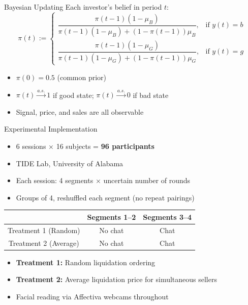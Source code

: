 \documentclass{beamer}
\begin{document}
\begin{frame}{Bayesian Updating}
Each investor's belief in period $t$:
\begin{equation*}
    \pi(t) :=
    \begin{cases}
        \dfrac{\pi(t\!-\!1)(1\!-\!\mu_B)}{\pi(t\!-\!1)(1\!-\!\mu_B) + (1\!-\!\pi(t\!-\!1))\mu_B}, & \text{if } y(t) = b \\[12pt]
        \dfrac{\pi(t\!-\!1)(1\!-\!\mu_G)}{\pi(t\!-\!1)(1\!-\!\mu_G) + (1\!-\!\pi(t\!-\!1))\mu_G}, & \text{if } y(t) = g
    \end{cases}
\end{equation*}

\begin{itemize}
    \item $\pi(0) = 0.5$ (common prior)
    \item $\pi(t) \overset{a.s.}{\to} 1$ if good state; $\pi(t) \overset{a.s.}{\to} 0$ if bad state
    \item Signal, price, and sales are all observable
\end{itemize}
\end{frame}


\begin{frame}{Experimental Implementation}
\begin{itemize}
    \item 6 sessions $\times$ 16 subjects = \textbf{96 participants}
    \item TIDE Lab, University of Alabama
    \item Each session: 4 segments $\times$ uncertain number of rounds
    \item Groups of 4, reshuffled each segment (no repeat pairings)
\end{itemize}

\vspace{0.3cm}
\begin{center}
\begin{tabular}{ccc}
\toprule
& \textbf{Segments 1--2} & \textbf{Segments 3--4} \\
\midrule
Treatment 1 (Random) & No chat & Chat \\
Treatment 2 (Average) & No chat & Chat \\
\bottomrule
\end{tabular}
\end{center}

\vspace{0.3cm}
\begin{itemize}
    \item \textbf{Treatment 1:} Random liquidation ordering
    \item \textbf{Treatment 2:} Average liquidation price for simultaneous sellers
    \item Facial reading via Affectiva webcams throughout
\end{itemize}
\end{frame}
\end{document}
